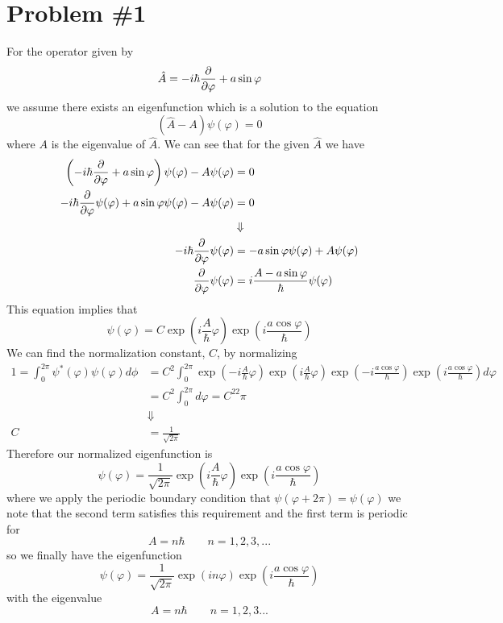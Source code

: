 \documentclass[11pt]{article}
\numberwithin{equation}{section}
\begin{document}


\section{Problem \#1}
For the operator given by
$$\hat{A} = -i\hbar\frac{\partial{}}{\partial{\varphi}} + a\sin\varphi$$
we assume there exists an eigenfunction which is a solution to the equation
$$(\hat{A} - A)\psi(\varphi) = 0$$
where $A$ is the eigenvalue of $\hat{A}$. We can see that for the given $\hat{A}$ we have
\begin{align*}
\left(-i\hbar\frac{\partial{}}{\partial{\varphi}} + a\sin\varphi\right)\psi(\varphi) - A\psi(\varphi) &= 0\\
-i\hbar\frac{\partial{}}{\partial{\varphi}}\psi(\varphi) + a\sin\varphi\psi(\varphi) - A\psi(\varphi) &= 0\\
&\Downarrow\\
-i\hbar\frac{\partial{}}{\partial{\varphi}}\psi(\varphi) &= - a\sin\varphi\psi(\varphi) + A\psi(\varphi)\\
\frac{\partial{}}{\partial{\varphi}}\psi(\varphi) &=i\frac{A-a\sin\varphi}{\hbar}\psi(\varphi)
\end{align*}
This equation implies that
$$\psi(\varphi) = C\exp\left(i\frac{A}{\hbar}\varphi\right)\exp\left(i\frac{a\cos\varphi}{\hbar}\right)$$
We can find the normalization constant, $C$, by normalizing
\begin{align*}
1 = \int_{0}^{2\pi}\psi^*(\varphi)\psi(\varphi)d\phi &= C^2\int_{0}^{2\pi}\exp\left(-i\frac{A}{\hbar}\varphi\right)\exp\left(i\frac{A}{\hbar}\varphi\right)\exp\left(-i\frac{a\cos\varphi}{\hbar}\right)\exp\left(i\frac{a\cos\varphi}{\hbar}\right)d\varphi\\
&= C^2\int_{0}^{2\pi}d\varphi = C^22\pi\\
&\Downarrow\\
C &= \frac{1}{\sqrt{2\pi}}
\end{align*}
Therefore our normalized eigenfunction is 
$$\psi(\varphi) = \frac{1}{\sqrt{2\pi}}\exp\left(i\frac{A}{\hbar}\varphi\right)\exp\left(i\frac{a\cos\varphi}{\hbar}\right)$$
where we apply the periodic boundary condition that $\psi(\varphi+2\pi)=\psi(\varphi)$ we 
note that the second term satisfies this requirement and the first term is periodic for
$$A = n\hbar\qquad n=1,2,3,...$$
so we finally have the eigenfunction 
$$\psi(\varphi) = \frac{1}{\sqrt{2\pi}}\exp\left(in\varphi\right)\exp\left(i\frac{a\cos\varphi}{\hbar}\right)$$
with the eigenvalue 
$$A = n\hbar\qquad n=1,2,3...$$
\pagebreak
\end{document}
